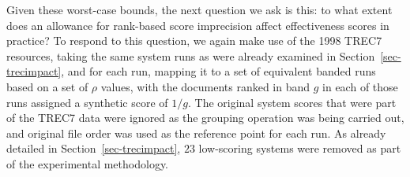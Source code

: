 
Given these worst-case bounds, the next question we ask is this: to
what extent does an allowance for rank-based score imprecision affect
effectiveness scores in practice?
To respond to this question, we again make use of the 1998 TREC7
resources, taking the same system runs as were already examined in
Section~\ref{sec-trecimpact}, and for each run, mapping it to a set
of equivalent banded runs based on a set of $\rho$ values, with the
documents ranked in band $g$ in each of those runs assigned a
synthetic score of $1/g$.
The original system scores that were part of the TREC7 data were
ignored as the grouping operation was being carried out, and original
file order was used as the reference point for each run.
As already detailed in Section~\ref{sec-trecimpact}, $23$ low-scoring
systems were removed as part of the experimental methodology.

